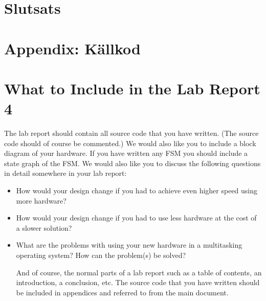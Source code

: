 \documentclass[a4paper]{article}
\begin{document}
\section{Slutsats}


\section{Appendix: Källkod}


\section{What to Include in the Lab Report 4}
The lab report should contain all source code that you have written. (The source code should of course be commented.) We would also like you to include a block diagram of your hardware. If you have written any FSM you should include a state graph of the FSM.
We would also like you to discuss the following questions in detail somewhere in your lab report:
\begin{itemize}

\item How would your design change if you had to achieve even higher speed using more hardware?
\item How would your design change if you had to use less hardware at the cost of a slower solution?
\item What are the problems with using your new hardware in a multitasking operating system? How can the problem(s) be solved?

And of course, the normal parts of a lab report such as a table of contents, an introduction, a conclusion, etc. The source code that you have written should be included in appendices and referred to from the main document.

\end{itemize}
\end{document}
